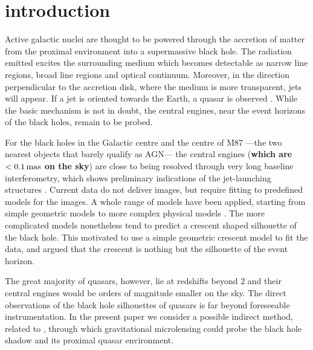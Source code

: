 \section{introduction}

Active galactic nuclei are thought to be powered through the
accretion of matter from the proximal environment into a supermassive
black hole.  The radiation emitted excites the surrounding medium
which becomes detectable as narrow line regions, broad line regions
and optical continuum.  Moreover, in the direction perpendicular to
the accretion disk, where the medium is more transparent, jets will
appear.  If a jet is oriented towards the Earth, a quasar is observed
\citep[e.g.,][]{1984RvMP...56..255B}.  While the basic mechanism
\citep[originating in the work
  of][]{1964ApJ...140..796S,1964SPhD....9..246Z,1969Natur.223..690L}
is not in doubt, the central engines, near the event horizons of the
black holes, remain to be probed.

For the black holes in the Galactic centre and the centre of M87
---the two nearest objects that barely qualify as AGN--- the central
engines (\textbf{which are $<0.1\rm\,mas$ on the sky}) are close to being
resolved through very long baseline interferometry, which shows
preliminary indications of the jet-launching structures
\citep{2008JPhCS.131a2055D,2012Sci...338..355D,2013MNRAS.434..765K,2016arXiv160205527F}.
Current data do not deliver images, but require fitting to
predefined models for the images.  A whole range of models have been
applied, starting from simple geometric models to more complex
physical models
\citep{2008Natur.455...78D,2011ApJ...738...38B,2009ApJ...706..497M,2010ApJ...717.1092D}.
The more complicated models nonetheless tend to predict a crescent
shaped silhouette of the black hole.  This motivated
\cite{2013MNRAS.434..765K} to use a simple geometric crescent model to
fit the data, and argued that the crescent is nothing but the
silhouette of the event horizon.

The great majority of quasars, however, lie at redshifts beyond 2
\citep{2014A&A...563A..54P} and their central engines would be orders
of magnitude smaller on the sky. The direct observations of the black
hole silhouettes of quasars is far beyond foreseeable instrumentation.
In the present paper we consider a possible indirect method, related
to \cite{1999ApJ...524...49A}, through which gravitational
microlensing could probe the black hole shadow and its proximal quasar
environment.

